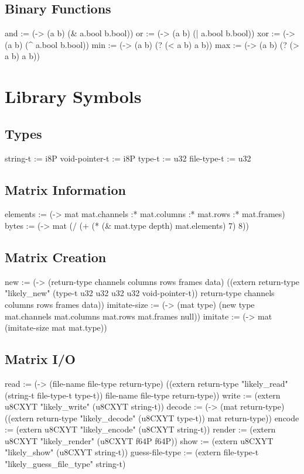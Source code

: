 \documentclass[numbers=noenddot]{scrbook}
\newenvironment{likely}
{ \verbatim }
{ \endverbatim }
\begin{document}
\section{Binary Functions}
\begin{likely}
and := (-> (a b) (& a.bool b.bool))
or  := (-> (a b) (| a.bool b.bool))
xor := (-> (a b) (^ a.bool b.bool))
min := (-> (a b) (? (< a b) a b))
max := (-> (a b) (? (> a b) a b))
\end{likely}

\chapter{Library Symbols}
\section{Types}
\begin{likely}
string-t       := i8P
void-pointer-t := i8P
type-t         := u32
file-type-t    := u32
\end{likely}

\section{Matrix Information}
\begin{likely}
elements := (-> mat mat.channels :* mat.columns :* mat.rows :* mat.frames)
bytes    := (-> mat (/ (+ (* (& mat.type depth) mat.elements) 7) 8))
\end{likely}

\section{Matrix Creation}
\begin{likely}
new := (-> (return-type channels columns rows frames data)
           ((extern return-type "likely_new" (type-t u32 u32 u32 u32 void-pointer-t)) return-type channels columns rows frames data))
imitate-size := (-> (mat type) (new type mat.channels mat.columns mat.rows mat.frames null))
imitate := (-> mat (imitate-size mat mat.type))
\end{likely}

\section{Matrix I/O}
\begin{likely}
read   := (-> (file-name file-type return-type)
              ((extern return-type "likely_read" (string-t file-type-t type-t)) file-name file-type return-type))
write  := (extern u8CXYT "likely_write" (u8CXYT string-t))
decode := (-> (mat return-type)
              ((extern return-type "likely_decode" (u8CXYT type-t)) mat return-type))
encode := (extern u8CXYT "likely_encode" (u8CXYT string-t))
render := (extern u8CXYT "likely_render" (u8CXYT f64P f64P))
show   := (extern u8CXYT "likely_show" (u8CXYT string-t))
guess-file-type := (extern file-type-t "likely_guess_file_type" string-t)
\end{likely}
\end{document}
